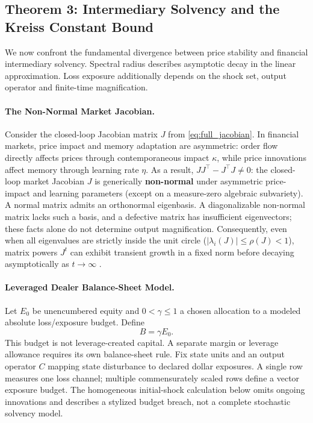 \documentclass[12pt]{article}
\theoremstyle{definition}
\theoremstyle{remark}
\begin{document}
\subsection{Theorem 3: Intermediary Solvency and the Kreiss Constant Bound}
We now confront the fundamental divergence between price stability and financial intermediary solvency. Spectral radius describes asymptotic decay in the linear approximation. Loss exposure additionally depends on the shock set, output operator and finite-time magnification.

\paragraph{The Non-Normal Market Jacobian.}
Consider the closed-loop Jacobian matrix $J$ from \eqref{eq:full_jacobian}. In financial markets, price impact and memory adaptation are asymmetric: order flow directly affects prices through contemporaneous impact $\kappa$, while price innovations affect memory through learning rate $\eta$. As a result, $J J^\top - J^\top J \neq 0$: the closed-loop market Jacobian $J$ is generically \textbf{non-normal} under asymmetric price-impact and learning parameters (except on a measure-zero algebraic subvariety). A normal matrix admits an orthonormal eigenbasis. A diagonalizable non-normal matrix lacks such a basis, and a defective matrix has insufficient eigenvectors; these facts alone do not determine output magnification. Consequently, even when all eigenvalues are strictly inside the unit circle ($|\lambda_i(J)| \le \rho(J) < 1$), matrix powers $J^t$ can exhibit transient growth in a fixed norm before decaying asymptotically as $t \to \infty$ \citep{trefethen2005spectra}.

\paragraph{Leveraged Dealer Balance-Sheet Model.}
Let $E_0$ be unencumbered equity and $0<\gamma\le1$ a chosen allocation to a modeled absolute loss/exposure budget. Define
\begin{equation}B=\gamma E_0.\label{eq:dealer_buffer}\end{equation}
This budget is not leverage-created capital. A separate margin or leverage allowance requires its own balance-sheet rule. Fix state units and an output operator $C$ mapping state disturbance to declared dollar exposures. A single row measures one loss channel; multiple commensurately scaled rows define a vector exposure budget. The homogeneous initial-shock calculation below omits ongoing innovations and describes a stylized budget breach, not a complete stochastic solvency model.
\end{document}
